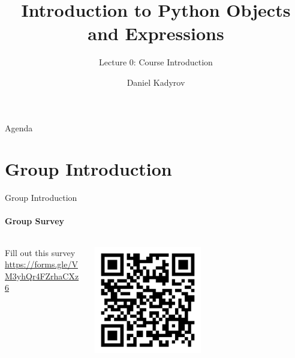 \documentclass[
    aspectratio=169, 
    usepdftitle=false, 
    xcolor={dvipsnames},
    hyperref={
        colorlinks,
        linkcolor=black,
        urlcolor=blue}
    ]{beamer}
\title[Course Introduction]{Introduction to Python Objects and Expressions}
\subtitle{Lecture 0: Course Introduction}
\author{Daniel Kadyrov}
\date{}
\begin{document}
\begin{frame}
\titlepage
\end{frame}

\begin{frame}{Agenda}
    \tableofcontents
\end{frame}

\section{Group Introduction}
\begin{frame}{Group Introduction}
    \framesubtitle{Group Survey}

    \begin{columns}
        \begin{column}{0.5\textwidth}
            \begin{block}{Fill out this survey}
                \url{https://forms.gle/VM3yhQr4FZrhaCXz6}
            \end{block}
        \end{column}
        \begin{column}{0.5\textwidth}  %
            \begin{center}
             \includegraphics[width=0.5\textwidth]{qr-code.pdf}
             \end{center}
        \end{column}
    \end{columns}
\end{frame}
\end{document}
